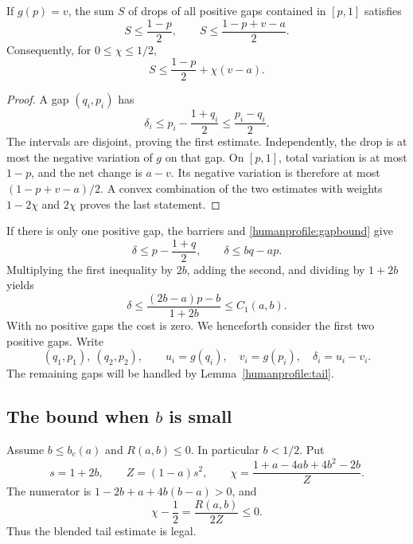 \begin{lemma}\label{humanprofile:tail}
If \(g(p)=v\), the sum \(S\) of drops of all positive gaps
contained in \([p,1]\) satisfies
\[
 S\le\frac{1-p}{2},\qquad
 S\le\frac{1-p+v-a}{2}.
\]
Consequently, for \(0\le\chi\le1/2\),
\begin{equation}\label{humanprofile:tailblend}
 S\le\frac{1-p}{2}+\chi(v-a).
\end{equation}
\end{lemma}
\begin{proof}
A gap \((q_i,p_i)\) has
\[
 \delta_i\le p_i-\frac{1+q_i}{2}
 \le\frac{p_i-q_i}{2}.
\]
The intervals are disjoint, proving the first estimate. Independently,
the drop is at most the negative variation of \(g\) on that gap.
On \([p,1]\), total variation is at most \(1-p\), and the
net change is \(a-v\). Its negative variation is therefore at most
\((1-p+v-a)/2\). A convex combination of the two estimates with
weights \(1-2\chi\) and \(2\chi\) proves the last statement.
\end{proof}

If there is only one positive gap, the barriers and
\eqref{humanprofile:gapbound} give
\[
 \delta\le p-\frac{1+q}{2},\qquad \delta\le bq-ap.
\]
Multiplying the first inequality by \(2b\), adding the second, and
dividing by \(1+2b\) yields
\begin{equation}\label{humanprofile:onegap}
 \delta\le\frac{(2b-a)p-b}{1+2b}\le C_1(a,b).
\end{equation}
With no positive gaps the cost is zero. We henceforth consider the first
two positive gaps. Write
\[
 (q_1,p_1),\ (q_2,p_2),\qquad
 u_i=g(q_i),\quad v_i=g(p_i),\quad \delta_i=u_i-v_i.
\]
The remaining gaps will be handled by Lemma~\ref{humanprofile:tail}.

\subsection{The bound when \(b\) is small}

Assume \(b\le b_c(a)\) and \(R(a,b)\le0\). In particular
\(b<1/2\). Put
\[
 s=1+2b,\qquad Z=(1-a)s^2,\qquad
 \chi=\frac{1+a-4ab+4b^2-2b}{Z}.
\]
The numerator is \(1-2b+a+4b(b-a)>0\), and
\[
 \chi-\frac12=\frac{R(a,b)}{2Z}\le0.
\]
Thus the blended tail estimate is legal.

